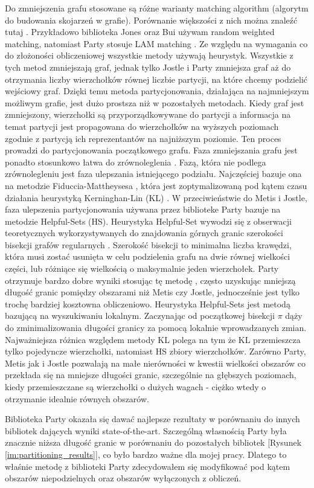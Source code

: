 Do zmniejszenia grafu stosowane są różne warianty matching algorithm (algorytm do budowania skojarzeń w grafie).
Porównanie większości z nich można znaleźć tutaj \cite{Analysis}.
Przykładowo biblioteka Jones oraz Bui \cite{Bui1993AHF} używam random weighted matching, natomiast Party \cite{1364754}
stosuje LAM matching \cite{weighted_maching}.
Ze względu na wymagania co do złożoności obliczeniowej wszystkie metody używają heurystyk.
Wszystkie z tych metod zmniejszają graf, jednak tylko Jostle i Party zmniejsza graf
aż do otrzymania liczby wierzchołków równej liczbie partycji, na które chcemy podzielić wejściowy graf.
Dzięki temu metoda partycjonowania, działająca na najmniejszym możliwym grafie, jest dużo prostsza niż w pozostałych metodach.
Kiedy graf jest zmniejszony, wierzchołki są przyporządkowywane do partycji a informacja na temat partycji jest propagowana
do wierzchołków na wyższych poziomach zgodnie z partycją ich reprezentantów na najniższym poziomie. Ten proces prowadzi
do partycjonowania początkowego grafu. Faza zmniejszania grafu jest ponadto stosunkowo łatwa do zrównoleglenia \cite{KARYPIS199871}.
Fazą, która nie podlega zrównolegleniu jest faza ulepszania istniejącego podziału.
Najczęściej bazuje ona na metodzie Fiduccia-Mattheysesa \cite{10.5555/800263.809204},
która jest zoptymalizowaną pod kątem czasu działania heurystyką Kerninghan-Lin (KL) \cite{6771089}.
W przeciwieństwie do Metis i Jostle, faza ulepszenia partycjonowania używana przez biblioteke Party bazuje na metodzie
Helpful-Sets (HS). Heurystyka Helpful-Set wywodzi się z obserwacji teoretycznych wykorzystywanych do znajdowania górnych
granic szerokości bisekcji grafów regularnych \cite{10.1007/3-540-54345-7_64, MONIEN2006475}.
Szerokość bisekcji to minimalna liczba krawędzi, która musi zostać usunięta w celu podzielenia grafu na
dwie równej wielkości części, lub różniące się wielkością o maksymalnie jeden wierzchołek.
Party otrzymuje bardzo dobre wyniki stosując tę metodę \cite{10.1007/3-540-44842-X_6}, często uzyskując mniejszą długość
granic pomiędzy obszarami niż Metis czy Jostle, jednocześnie jest tylko trochę bardziej kosztowna obliczeniowo.
Heurystyka Helpful-Sets jest metodą bazującą na wyszukiwaniu lokalnym. Zaczynając od początkowej bisekcji \(\pi\) dąży
do zminimalizowania długości granicy za pomocą lokalnie wprowadzanych zmian. Najważniejsza różnica względem metody KL
polega na tym że KL przemieszcza tylko pojedyncze wierzchołki, natomiast HS zbiory wierzchołków. Zarówno Party, Metis
jak i Jostle pozwalają na małe nierówności w kwestii wielkości obszarów co przekłada się na mniejsze długości granic,
szczególnie na głębszych poziomach, kiedy przemieszczane są wierzchołki o dużych wagach - ciężko wtedy o otrzymanie
idealnie równych obszarów.

Biblioteka Party \cite{1364754} okazała się dawać najlepsze rezultaty w porównaniu do innych bibliotek dających wyniki
state-of-the-art. Szczególną własnością Party była znacznie niższa długość granic w porównaniu do pozostałych bibliotek
[Rysunek \ref{im:partitioning_results}], co było bardzo ważne dla mojej pracy. Dlatego to właśnie metodę z biblioteki
Party zdecydowałem się modyfikować pod kątem obszarów niepodzielnych oraz obszarów wyłączonych z obliczeń.
